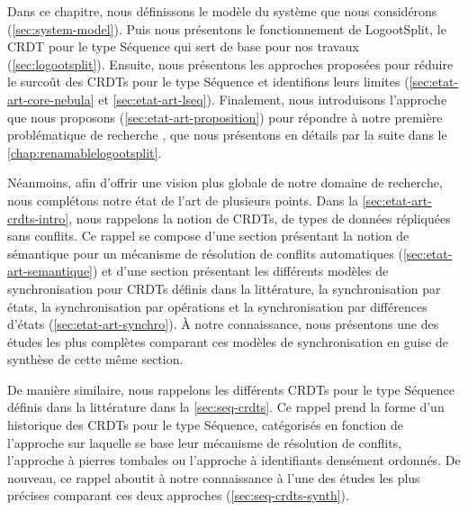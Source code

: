 Dans ce chapitre, nous définissons le modèle du système que nous considérons (\autoref{sec:system-model}).
Puis nous présentons le fonctionnement de LogootSplit, le \acf{CRDT} pour le type Séquence qui sert de base pour nos travaux (\autoref{sec:logootsplit}).
Ensuite, nous présentons les approches proposées pour réduire le surcoût des \acp{CRDT} pour le type Séquence et identifions leurs limites (\autoref{sec:etat-art-core-nebula} et \autoref{sec:etat-art-lseq}).
Finalement, nous introduisons l'approche que nous proposons (\autoref{sec:etat-art-proposition}) pour répondre à notre première problématique de recherche , que nous présentons en détails par la suite dans le \autoref{chap:renamablelogootsplit}.

Néanmoins, afin d'offrir une vision plus globale de notre domaine de recherche, nous complétons notre état de l'art de plusieurs points.
Dans la \autoref{sec:etat-art-crdts-intro}, nous rappelons la notion de \acp{CRDT}, \ie de types de données répliquées sans conflits.
Ce rappel se compose d'une section présentant la notion de sémantique pour un mécanisme de résolution de conflits automatiques (\autoref{sec:etat-art-semantique}) et d'une section présentant les différents modèles de synchronisation pour \acp{CRDT} définis dans la littérature, \ie la synchronisation par états, la synchronisation par opérations et la synchronisation par différences d'états (\autoref{sec:etat-art-synchro}).
À notre connaissance, nous présentons une des études les plus complètes comparant ces modèles de synchronisation en guise de synthèse de cette même section.

De manière similaire, nous rappelons les différents \acp{CRDT} pour le type Séquence définis dans la littérature dans la \autoref{sec:seq-crdts}.
Ce rappel prend la forme d'un historique des \acp{CRDT} pour le type Séquence, catégorisés en fonction de l'approche sur laquelle se base leur mécanisme de résolution de conflits, \ie l'approche à pierres tombales ou l'approche à identifiants densément ordonnés.
De nouveau, ce rappel aboutit à notre connaissance à l'une des études les plus précises comparant ces deux approches (\autoref{sec:seq-crdts-synth}).
